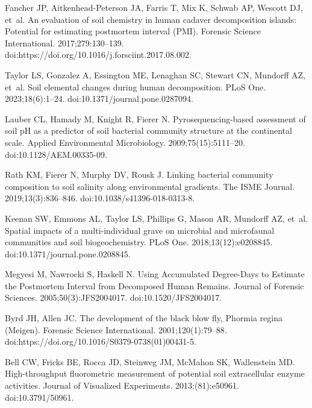 \documentclass[
  10pt,
  letterpaper,
]{article}
\begin{document}
\begin{thebibliography}{10}
  Fancher JP, Aitkenhead-Peterson JA, Farris T, Mix K, Schwab AP, Wescott DJ,
    et~al.
  \newblock An evaluation of soil chemistry in human cadaver decomposition
    islands: {Potential} for estimating postmortem interval ({PMI}).
  \newblock Forensic Science International. 2017;279:130--139.
  \newblock doi:{https://doi.org/10.1016/j.forsciint.2017.08.002}.
  
  Taylor LS, Gonzalez A, Essington ME, Lenaghan SC, Stewart CN, Mundorff AZ,
    et~al.
  \newblock Soil elemental changes during human decomposition.
  \newblock PLoS One. 2023;18(6):1--24.
  \newblock doi:{10.1371/journal.pone.0287094}.
  
  Lauber CL, Hamady M, Knight R, Fierer N.
  \newblock Pyrosequencing-based assessment of soil {pH} as a predictor of soil
    bacterial community structure at the continental scale.
  \newblock Applied Environmental Microbiology. 2009;75(15):5111--20.
  \newblock doi:{10.1128/AEM.00335-09}.
  
  Rath KM, Fierer N, Murphy DV, Rousk J.
  \newblock Linking bacterial community composition to soil salinity along
    environmental gradients.
  \newblock The ISME Journal. 2019;13(3):836--846.
  \newblock doi:{10.1038/s41396-018-0313-8}.
  
  Keenan SW, Emmons AL, Taylor LS, Phillips G, Mason AR, Mundorff AZ, et~al.
  \newblock Spatial impacts of a multi-individual grave on microbial and
    microfaunal communities and soil biogeochemistry.
  \newblock PLoS One. 2018;13(12):e0208845.
  \newblock doi:{10.1371/journal.pone.0208845}.
  
  Megyesi M, Nawrocki S, Haskell N.
  \newblock Using {Accumulated} {Degree}-{Days} to {Estimate} the {Postmortem}
    {Interval} from {Decomposed} {Human} {Remains}.
  \newblock Journal of Forensic Sciences. 2005;50(3):JFS2004017.
  \newblock doi:{10.1520/JFS2004017}.
  
  Byrd JH, Allen JC.
  \newblock The development of the black blow fly, {Phormia} regina ({Meigen}).
  \newblock Forensic Science International. 2001;120(1):79--88.
  \newblock doi:{https://doi.org/10.1016/S0379-0738(01)00431-5}.
  
  Bell CW, Fricks BE, Rocca JD, Steinweg JM, McMahon SK, Wallenstein MD.
  \newblock High-throughput fluorometric measurement of potential soil
    extracellular enzyme activities.
  \newblock Journal of Visualized Experiments. 2013;(81):e50961.
  \newblock doi:{10.3791/50961}.
  

\end{thebibliography}
\end{document}
